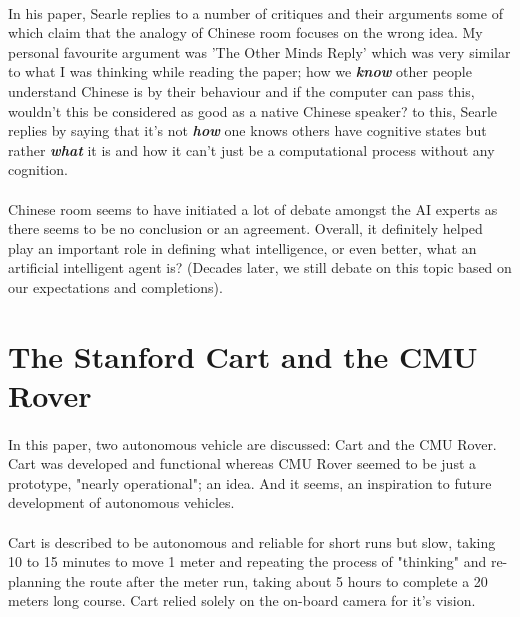 \documentclass[10pt]{article}
\begin{document}
  \paragraph{}\indent
  In his paper, Searle replies to a number of critiques and their arguments some of which claim that the analogy of Chinese room focuses on the wrong idea. My personal favourite argument was 'The Other Minds Reply' which was very similar to what I was thinking while reading the paper; how we \textit{\textbf{know}} other people understand Chinese is by their behaviour and if the computer can pass this, wouldn't this be considered as good as a native Chinese speaker? to this, Searle replies by saying that it's not \textit{\textbf{how}} one knows others have cognitive states but rather \textit{\textbf{what}} it is and how it can't just be a computational process without any cognition.
  \paragraph{}\indent
  Chinese room seems to have initiated a lot of debate amongst the AI experts as there seems to be no conclusion or an agreement. Overall, it definitely helped play an important role in defining what intelligence, or even better, what an artificial intelligent agent is? (Decades later, we still debate on this topic based on our expectations and completions).

  \section{The Stanford Cart and the CMU Rover}
  \paragraph{} \indent
  In this paper, two autonomous vehicle are discussed: Cart and the CMU Rover. Cart was developed and functional whereas CMU Rover seemed to be just a prototype, "nearly operational"; an idea. And it seems, an inspiration to future development of autonomous vehicles. 
  \paragraph{}\indent
  Cart is described to be autonomous and reliable for short runs but slow, taking 10 to 15 minutes to move 1 meter and repeating the process of "thinking" and re-planning the route after the meter run, taking about 5 hours to complete a 20 meters long course. Cart relied solely on the on-board camera for it's vision. 
\end{document}
